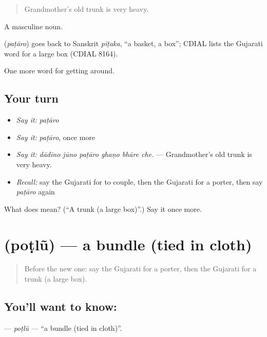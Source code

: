 \begin{quote}
Grandmother's old trunk is very heavy.
\end{quote}

A masculine noun.

\begin{cousinweb}
\textbf{} (\emph{paṭāro}) goes back to Sanskrit \emph{piṭaka}, \textquotedblleft{}a basket, a box\textquotedblright{}; CDIAL lists the Gujarati word for a large box (CDIAL 8164).
\end{cousinweb}

\begin{grammarlens}[title={What you've built}]
One more word for getting around.
\end{grammarlens}

\subsection*{Your turn}
\begin{itemize}
\raggedright
  \item \emph{Say it:} \emph{paṭāro}
  \item \emph{Say it:} \emph{paṭāro}, once more
  \item \emph{Say it:} \emph{dādīno jūno paṭāro ghaṇo bhāre che.} — Grandmother's old trunk is very heavy.
  \item \emph{Recall:} say the Gujarati for to couple, then the Gujarati for a porter, then say \emph{paṭāro} again
\end{itemize}

\begin{tcolorbox}[breakable,colback=teal!4,colframe=teal!35!black,title={Before you move on}]
What does  mean? (\textquotedblleft{}A trunk (a large box)\textquotedblright{}.) Say it once more.
\end{tcolorbox}
\section[\texorpdfstring{\gu{પોટલું} (poṭlũ)}{પોટલું (poṭlũ)}]{ (poṭlũ) — a bundle (tied in cloth)}

\label{lesson:GU-C394-potlu}



\begin{quote}
Before the new one: say the Gujarati for a porter, then the Gujarati for a trunk (a large box).
\end{quote}

\subsection*{You'll want to know: }
\textbf{} — \emph{poṭlũ} — \textquotedblleft{}a bundle (tied in cloth)\textquotedblright{}.

